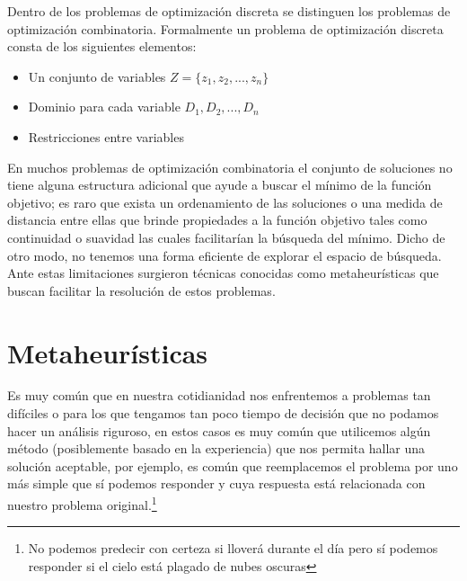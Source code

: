 Dentro de los problemas de optimización discreta se distinguen los problemas de optimización combinatoria. Formalmente un problema de optimización discreta consta de los siguientes elementos\cite{Blum2003}:
\begin{itemize}
    \item Un conjunto de variables $Z=\{z_1,z_2,...,z_n\}$
    \item Dominio para cada variable $D_1,D_2,...,D_n$
    \item Restricciones entre variables
\end{itemize}

En muchos problemas de optimización combinatoria el conjunto de soluciones no tiene alguna estructura adicional que ayude a buscar el mínimo de la función objetivo; es raro que exista un ordenamiento de las soluciones o una medida de distancia entre ellas que brinde propiedades a la función objetivo tales como continuidad o suavidad las cuales facilitarían la búsqueda del mínimo. Dicho de otro modo, no tenemos una forma eficiente de explorar el espacio de búsqueda. Ante estas limitaciones surgieron técnicas conocidas como metaheurísticas que buscan facilitar la resolución de estos problemas.

\section{Metaheurísticas}
Es muy común que en nuestra cotidianidad nos enfrentemos a problemas tan difíciles o para los que tengamos tan poco tiempo de decisión que no podamos hacer un análisis riguroso, en estos casos es muy común que utilicemos algún método (posiblemente basado en la experiencia) que nos permita hallar una solución aceptable, por ejemplo, es común que reemplacemos el problema por uno más simple que sí podemos responder y cuya respuesta está relacionada con nuestro problema original.\footnote{No podemos predecir con certeza si lloverá durante el día pero sí podemos responder si el cielo está plagado de nubes oscuras}  

